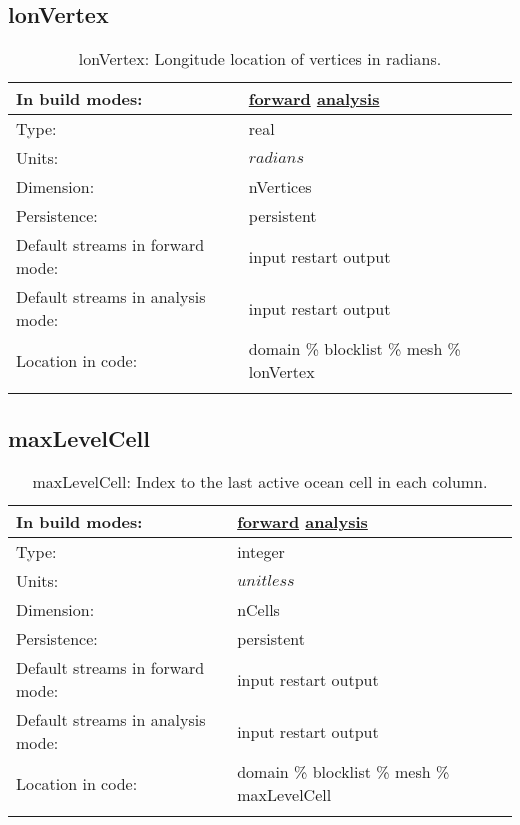 \subsection[lonVertex]{lonVertex}
\label{subsec:var_sec_mesh_lonVertex}
\begin{center}
\begin{longtable}{| p{2.0in} | p{4.0in} |}
        \hline 
        In build modes: & \hyperref[subsec:forward_var_tab_mesh]{forward} \hyperref[subsec:analysis_var_tab_mesh]{analysis} \\
        \hline 
        Type: & real \\
        \hline 
        Units: & $radians$ \\
        \hline 
        Dimension: & nVertices \\
        \hline 
        Persistence: & persistent \\
        \hline 
		 Default streams in forward mode: &  input restart output \\
        \hline 
		 Default streams in analysis mode: &  input restart output \\
        \hline 
		 Location in code: & domain \% blocklist \% mesh \% lonVertex \\
		 \hline 
    \caption{lonVertex: Longitude location of vertices in radians.}
\end{longtable}
\end{center}
\subsection[maxLevelCell]{maxLevelCell}
\label{subsec:var_sec_mesh_maxLevelCell}
\begin{center}
\begin{longtable}{| p{2.0in} | p{4.0in} |}
        \hline 
        In build modes: & \hyperref[subsec:forward_var_tab_mesh]{forward} \hyperref[subsec:analysis_var_tab_mesh]{analysis} \\
        \hline 
        Type: & integer \\
        \hline 
        Units: & $unitless$ \\
        \hline 
        Dimension: & nCells \\
        \hline 
        Persistence: & persistent \\
        \hline 
		 Default streams in forward mode: &  input restart output \\
        \hline 
		 Default streams in analysis mode: &  input restart output \\
        \hline 
		 Location in code: & domain \% blocklist \% mesh \% maxLevelCell \\
		 \hline 
    \caption{maxLevelCell: Index to the last active ocean cell in each column.}
\end{longtable}
\end{center}

